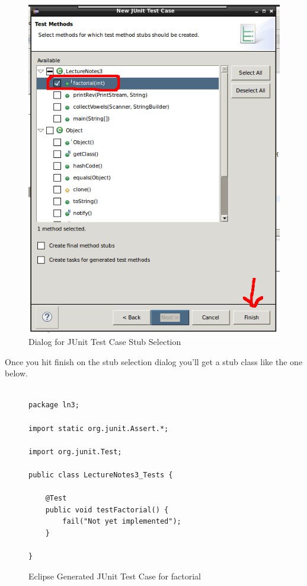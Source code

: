 \documentclass[]{tufte-handout}
\begin{document}
\vspace{.1in}
\begin{center}
\begin{figure}[!htb]
\includegraphics[scale=.5]{Eclipse-JUnitCaseStubSelect.png}
\caption{Dialog for JUnit Test Case Stub Selection} 
\label{fig:selectstubs}
\end{figure}
\end{center}
\vspace{.1in}

Once you hit finish on the stub selection dialog you'll get a stub class like the one below. 
\begin{figure}
\begin{lstlisting}

package ln3;

import static org.junit.Assert.*;

import org.junit.Test;

public class LectureNotes3_Tests {

	@Test
	public void testFactorial() {
		fail("Not yet implemented");
	}

}

\end{lstlisting}
\caption{Eclipse Generated JUnit Test Case for factorial}
\label{fig:testStub}
\end{figure}
\end{document}
